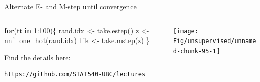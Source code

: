 \documentclass[
  ignorenonframetext,
  aspectratio=169]{beamer}
\newenvironment{Shaded}{\begin{snugshade}}{\end{snugshade}}
\newcommand{\ControlFlowTok}[1]{\textcolor[rgb]{0.13,0.29,0.53}{\textbf{#1}}}
\newcommand{\DecValTok}[1]{\textcolor[rgb]{0.00,0.00,0.81}{#1}}
\newcommand{\FunctionTok}[1]{\textcolor[rgb]{0.00,0.00,0.00}{#1}}
\newcommand{\NormalTok}[1]{#1}
\newcommand{\OtherTok}[1]{\textcolor[rgb]{0.56,0.35,0.01}{#1}}
\newcommand{\SpecialCharTok}[1]{\textcolor[rgb]{0.00,0.00,0.00}{#1}}
\begin{document}
\begin{frame}[fragile]{Alternate E- and M-step until convergence}
\protect\hypertarget{alternate-e--and-m-step-until-convergence}{}
\begin{columns}[T]
\begin{column}{.5\textwidth}
\large

\begin{Shaded}
\begin{Highlighting}[]
\ControlFlowTok{for}\NormalTok{(tt }\ControlFlowTok{in} \DecValTok{1}\SpecialCharTok{:}\DecValTok{100}\NormalTok{)\{}
\NormalTok{    rand.idx }\OtherTok{\textless{}{-}} \FunctionTok{take.estep}\NormalTok{()}
\NormalTok{    z }\OtherTok{\textless{}{-}} \FunctionTok{nnf\_one\_hot}\NormalTok{(rand.idx)}
\NormalTok{    llik }\OtherTok{\textless{}{-}} \FunctionTok{take.mstep}\NormalTok{(z)}
\NormalTok{\}}
\end{Highlighting}
\end{Shaded}

\normalsize

Find the details here:

\begin{verbatim}
https://github.com/STAT540-UBC/lectures
\end{verbatim}
\end{column}

\begin{column}{.5\textwidth}
\scriptsize

\begin{center}\texttt{[image: Fig/unsupervised/unnamed-chunk-95-1]} \end{center}

\normalsize
\end{column}
\end{columns}
\end{frame}
\end{document}
